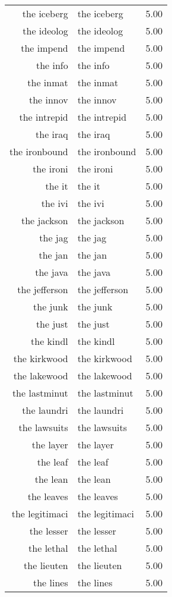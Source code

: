 \begin{table}[ht]
\begin{tabular}{rlr}
  the iceberg & the iceberg & 5.00 \\ 
  the ideolog & the ideolog & 5.00 \\ 
  the impend & the impend & 5.00 \\ 
  the info & the info & 5.00 \\ 
  the inmat & the inmat & 5.00 \\ 
  the innov & the innov & 5.00 \\ 
  the intrepid & the intrepid & 5.00 \\ 
  the iraq & the iraq & 5.00 \\ 
  the ironbound & the ironbound & 5.00 \\ 
  the ironi & the ironi & 5.00 \\ 
  the it & the it & 5.00 \\ 
  the ivi & the ivi & 5.00 \\ 
  the jackson & the jackson & 5.00 \\ 
  the jag & the jag & 5.00 \\ 
  the jan & the jan & 5.00 \\ 
  the java & the java & 5.00 \\ 
  the jefferson & the jefferson & 5.00 \\ 
  the junk & the junk & 5.00 \\ 
  the just & the just & 5.00 \\ 
  the kindl & the kindl & 5.00 \\ 
  the kirkwood & the kirkwood & 5.00 \\ 
  the lakewood & the lakewood & 5.00 \\ 
  the lastminut & the lastminut & 5.00 \\ 
  the laundri & the laundri & 5.00 \\ 
  the lawsuits & the lawsuits & 5.00 \\ 
  the layer & the layer & 5.00 \\ 
  the leaf & the leaf & 5.00 \\ 
  the lean & the lean & 5.00 \\ 
  the leaves & the leaves & 5.00 \\ 
  the legitimaci & the legitimaci & 5.00 \\ 
  the lesser & the lesser & 5.00 \\ 
  the lethal & the lethal & 5.00 \\ 
  the lieuten & the lieuten & 5.00 \\ 
  the lines & the lines & 5.00 \\ 

\end{tabular}
\end{table}
